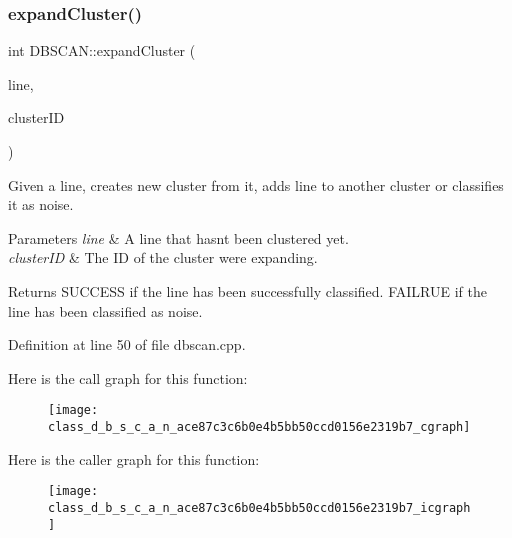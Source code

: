 \subsubsection{\texorpdfstring{expand\+Cluster()}{expandCluster()}}
{\footnotesize\ttfamily int D\+B\+S\+C\+A\+N\+::expand\+Cluster (\begin{DoxyParamCaption}\item[{\hyperlink{classdefals_1_1_clustered_line}{defals\+::\+Clustered\+Line} \&}]{line,  }\item[{int}]{cluster\+ID }\end{DoxyParamCaption})\hspace{0.3cm}{\ttfamily [private]}}

Given a line, creates new cluster from it, adds line to another cluster or classifies it as noise.


\begin{DoxyParams}{Parameters}
{\em line} & A line that hasn\textquotesingle{}t been clustered yet. \\
\hline
{\em cluster\+ID} & The ID of the cluster we\textquotesingle{}re expanding.\\
\hline
\end{DoxyParams}
\begin{DoxyReturn}{Returns}
S\+U\+C\+C\+E\+SS if the line has been successfully classified. F\+A\+I\+L\+R\+UE if the line has been classified as noise. 
\end{DoxyReturn}


Definition at line 50 of file dbscan.\+cpp.

Here is the call graph for this function\+:\nopagebreak
\begin{figure}[H]
\begin{center}
\leavevmode
\texttt{[image: class\_d\_b\_s\_c\_a\_n\_ace87c3c6b0e4b5bb50ccd0156e2319b7\_cgraph]}
\end{center}
\end{figure}
Here is the caller graph for this function\+:\nopagebreak
\begin{figure}[H]
\begin{center}
\leavevmode
\texttt{[image: class\_d\_b\_s\_c\_a\_n\_ace87c3c6b0e4b5bb50ccd0156e2319b7\_icgraph]}
\end{center}
\end{figure}
\mbox{\label{class_d_b_s_c_a_n_a0085bd9fa516dc3c1a62da8fcb3ba6de}} 
